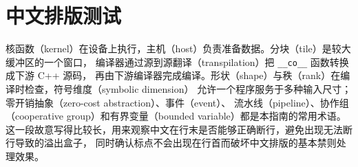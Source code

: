 \documentclass[11pt,a4paper]{article}
\begin{document}
\section*{中文排版测试}
核函数（kernel）在设备上执行，主机（host）负责准备数据。分块（tile）是较大缓冲区的一个窗口，
编译器通过源到源翻译（transpilation）把 \texttt{\_\_co\_\_} 函数转换成下游 C++ 源码，
再由下游编译器完成编译。形状（shape）与秩（rank）在编译时检查，符号维度（symbolic dimension）
允许一个程序服务于多种输入尺寸；零开销抽象（zero-cost abstraction）、事件（event）、
流水线（pipeline）、协作组（cooperative group）和有界变量（bounded variable）都是本指南的常用术语。
这一段故意写得比较长，用来观察中文在行末是否能够正确断行，避免出现无法断行导致的溢出盒子，
同时确认标点不会出现在行首而破坏中文排版的基本禁则处理效果。
\end{document}
